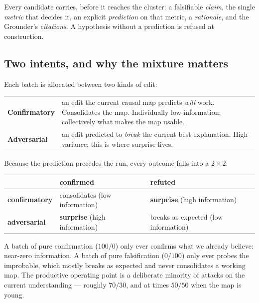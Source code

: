 \documentclass[11pt]{article}
\begin{document}
Every candidate carries, before it reaches the cluster: a falsifiable \emph{claim}, the single
\emph{metric} that decides it, an explicit \emph{prediction} on that metric, a \emph{rationale},
and the Grounder's \emph{citations}. A hypothesis without a prediction is refused at construction.

\subsection{Two intents, and why the mixture matters}

Each batch is allocated between two kinds of edit:

\begin{center}\small
\begin{tabular}{@{}p{2.6cm}p{11.6cm}@{}}
\toprule
\textbf{Confirmatory} & an edit the current causal map predicts \emph{will} work. Consolidates
the map. Individually low-information; collectively what makes the map usable. \\
\textbf{Adversarial} & an edit predicted to \emph{break} the current best explanation.
High-variance; this is where surprise lives. \\
\bottomrule
\end{tabular}
\end{center}

Because the prediction precedes the run, every outcome falls into a $2\times2$:

\begin{center}\small
\begin{tabular}{@{}lll@{}}
\toprule
 & \textbf{confirmed} & \textbf{refuted} \\
\midrule
\textbf{confirmatory} & consolidates (low information) & \textbf{surprise} (high information) \\
\textbf{adversarial}  & \textbf{surprise} (high information) & breaks as expected (low information) \\
\bottomrule
\end{tabular}
\end{center}

A batch of pure confirmation ($100/0$) only ever confirms what we already believe: near-zero
information. A batch of pure falsification ($0/100$) only ever probes the improbable, which mostly
breaks as expected and never consolidates a working map. The productive operating point is a
deliberate minority of attacks on the current understanding --- roughly $70/30$, and at times
$50/50$ when the map is young.
\end{document}
